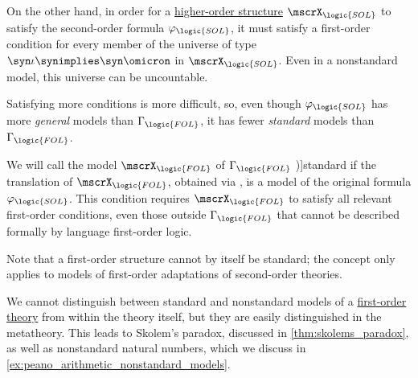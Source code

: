 \begin{definition}
  On the other hand, in order for a \hyperref[def:hol_structure]{higher-order structure} \( \mscrX_{\logic{SOL}} \) to satisfy the second-order formula \( \varphi_{\logic{SOL}} \), it must satisfy a first-order condition for every member of the universe of type \( {\syn\iota \synimplies \syn\omicron} \) in \( \mscrX_{\logic{SOL}} \). Even in a nonstandard model, this universe can be uncountable.

  Satisfying more conditions is more difficult, so, even though \( \varphi_{\logic{SOL}} \) has more \emph{general} models than \( \Gamma_{\logic{FOL}} \), it has fewer \emph{standard} models than \( \Gamma_{\logic{FOL}} \).

  We will call the model \( \mscrX_{\logic{FOL}} \) of \( \Gamma_{\logic{FOL}} \) \term[en=standard model (\cite[280]{Farmer2008STTVirtues})]{standard} if the translation of \( \mscrX_{\logic{FOL}} \), obtained via , is a model of the original formula \( \varphi_{\logic{SOL}} \). This condition requires \( \mscrX_{\logic{FOL}} \) to satisfy all relevant first-order conditions, even those outside \( \Gamma_{\logic{FOL}} \) that cannot be described formally by language first-order logic.
\end{definition}
\begin{comments}
  \item Note that a first-order structure cannot by itself be standard; the concept only applies to models of first-order adaptations of second-order theories.

  \item We cannot distinguish between standard and nonstandard models of a \hyperref[def:hol_theory]{first-order theory} from within the theory itself, but they are easily distinguished in the metatheory. This leads to Skolem's paradox, discussed in \cref{thm:skolems_paradox}, as well as nonstandard natural numbers, which we discuss in \cref{ex:peano_arithmetic_nonstandard_models}.
\end{comments}
